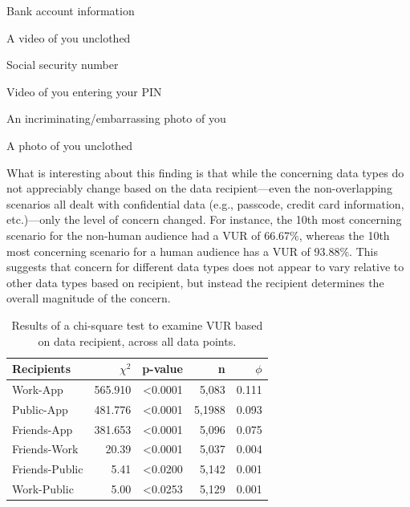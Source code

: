 \documentclass{acm_proc_article-sp}
\newenvironment{packed_enum}{
\begin{enumerate}
  \setlength{\itemsep}{1pt}
  \setlength{\parskip}{0pt}
  \setlength{\parsep}{0pt}
}{\end{enumerate}}
\begin{document}
\begin{packed_enum}
\item Bank account information
\item A video of you unclothed
\item Social security number
\item Video of you entering your PIN
\item An incriminating/embarrassing photo of you
\item A photo of you unclothed
\end{packed_enum}

What is interesting about this finding is that while the concerning data types do not appreciably change based on the data recipient---even the non-overlapping scenarios all dealt with confidential data (e.g., passcode, credit card information, etc.)---only the level of concern changed. For instance, the 10th most concerning scenario for the non-human audience had a VUR of 66.67\%, whereas the 10th most concerning scenario for a human audience has a VUR of 93.88\%. This suggests that concern for different data types does not appear to vary relative to other data types based on recipient, but instead the recipient determines the overall magnitude of the concern.



\begin{table}[t]
\begin{center}
\begin{tabular}{|l|r|r|r|r|}
\hline
Recipients	& $\chi^2$ & p-value 	& n & $\phi$ \\
\hline
Work-App	& 565.910 & <0.0001 & 5,083 & 0.111\\
Public-App	& 481.776 & <0.0001 & 5,1988& 0.093\\
Friends-App & 381.653 & <0.0001 & 5,096 & 0.075\\
Friends-Work & 20.39 & <0.0001 & 5,037 & 0.004\\
Friends-Public & 5.41 & <0.0200 & 5,142 & 0.001\\
Work-Public&  5.00 & <0.0253 & 5,129	& 0.001\\
\hline
\end{tabular}
\caption{Results of a chi-square test to examine VUR based on data recipient, across all data points.}
\label{recipient}
\end{center}
\end{table}
\end{document}
